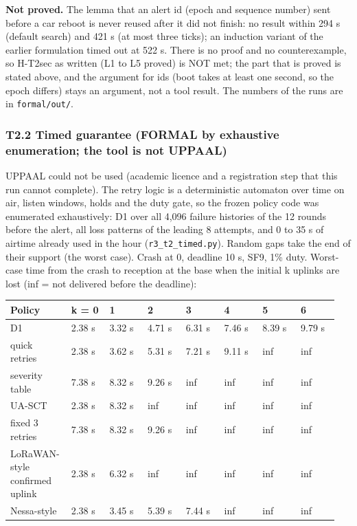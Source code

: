 \textbf{Not proved.} The lemma that an alert id (epoch and sequence number) sent before a car reboot is never reused after it did not finish: no result within 294 s (default search) and 421 s (at most three ticks); an induction variant of the earlier formulation timed out at 522 s. There is no proof and no counterexample, so H-T2sec as written (L1 to L5 proved) is NOT met; the part that is proved is stated above, and the argument for ids (boot takes at least one second, so the epoch differs) stays an argument, not a tool result. The numbers of the runs are in \texttt{formal/out/}.

\subsubsection*{T2.2 Timed guarantee (FORMAL by exhaustive enumeration; the tool is not UPPAAL)}

UPPAAL could not be used (academic licence and a registration step that this run cannot complete). The retry logic is a deterministic automaton over time on air, listen windows, holds and the duty gate, so the frozen policy code was enumerated exhaustively: D1 over all 4,096 failure histories of the 12 rounds before the alert, all loss patterns of the leading 8 attempts, and 0 to 35 s of airtime already used in the hour (\texttt{r3\_t2\_timed.py}). Random gaps take the end of their support (the worst case). Crash at 0, deadline 10 s, SF9, 1\% duty. Worst-case time from the crash to reception at the base when the initial k uplinks are lost (inf = not delivered before the deadline):

{\scriptsize\raggedright
\begin{longtable}{p{0.119\linewidth}p{0.119\linewidth}p{0.119\linewidth}p{0.119\linewidth}p{0.119\linewidth}p{0.119\linewidth}p{0.119\linewidth}p{0.119\linewidth}}
\toprule
Policy & k = 0 & 1 & 2 & 3 & 4 & 5 & 6 \\
\midrule
\endhead
D1 & 2.38 s & 3.32 s & 4.71 s & 6.31 s & 7.46 s & 8.39 s & 9.79 s \\
quick retries & 2.38 s & 3.62 s & 5.31 s & 7.21 s & 9.11 s & inf & inf \\
severity table & 7.38 s & 8.32 s & 9.26 s & inf & inf & inf & inf \\
UA-SCT & 2.38 s & 8.32 s & inf & inf & inf & inf & inf \\
fixed 3 retries & 7.38 s & 8.32 s & 9.26 s & inf & inf & inf & inf \\
LoRaWAN-style confirmed uplink & 2.38 s & 6.32 s & inf & inf & inf & inf & inf \\
Nessa-style & 2.38 s & 3.45 s & 5.39 s & 7.44 s & inf & inf & inf \\
\bottomrule
\end{longtable}}

